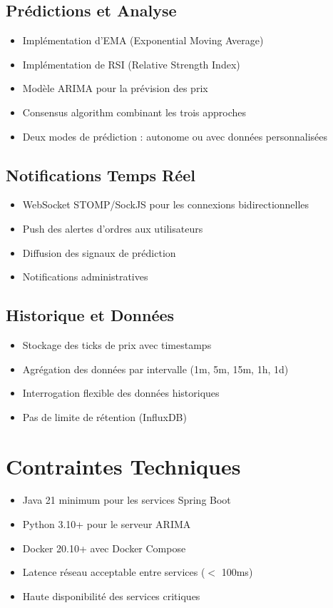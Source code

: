 \documentclass[12pt,a4paper,twoside]{report}
\begin{document}
\subsection{Prédictions et Analyse}
\begin{itemize}
    \item Implémentation d'EMA (Exponential Moving Average)
    \item Implémentation de RSI (Relative Strength Index)
    \item Modèle ARIMA pour la prévision des prix
    \item Consensus algorithm combinant les trois approches
    \item Deux modes de prédiction : autonome ou avec données personnalisées
\end{itemize}

\subsection{Notifications Temps Réel}
\begin{itemize}
    \item WebSocket STOMP/SockJS pour les connexions bidirectionnelles
    \item Push des alertes d'ordres aux utilisateurs
    \item Diffusion des signaux de prédiction
    \item Notifications administratives
\end{itemize}

\subsection{Historique et Données}
\begin{itemize}
    \item Stockage des ticks de prix avec timestamps
    \item Agrégation des données par intervalle (1m, 5m, 15m, 1h, 1d)
    \item Interrogation flexible des données historiques
    \item Pas de limite de rétention (InfluxDB)
\end{itemize}

\section{Contraintes Techniques}
\begin{itemize}
    \item Java 21 minimum pour les services Spring Boot
    \item Python 3.10+ pour le serveur ARIMA
    \item Docker 20.10+ avec Docker Compose
    \item Latence réseau acceptable entre services ($<$ 100ms)
    \item Haute disponibilité des services critiques
\end{itemize}
\end{document}

